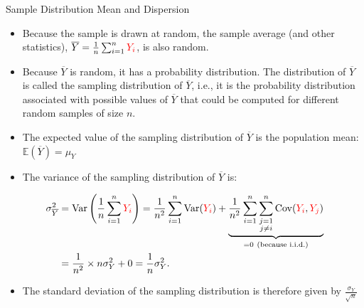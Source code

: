 \documentclass[notes,10pt, aspectratio=169]{beamer}
\begin{document}
\begin{frame}{Sample Distribution Mean and Dispersion}
    \begin{itemize}
        \item Because the sample is drawn at random, the sample average (and other statistics), $\overline{Y}=\frac{1}{n}\sum^n_{i=1} \textcolor{red}{Y_i}$, is also random.\vspace{.2cm}
        \item Because $\overline{Y}$ is random, it has a probability distribution. The distribution of $\overline{Y}$ is called the sampling distribution of $\overline{Y}$, i.e., it is the probability distribution associated with possible values of $\overline{Y}$ that could be computed for different random samples of size $n$.\vspace{.2cm}
        \item The expected value of the sampling distribution of $\overline{Y}$ is the population mean: $\mathbb{E}(\overline{Y})=\mu_Y$\vspace{.2cm}
        \item The variance of the sampling distribution of $\overline{Y}$ is:
    \end{itemize}
    \begin{eqnarray*}
        \begin{aligned}
        \sigma^2_{\overline{Y}}
        &=\operatorname{Var}\left(\frac{1}{n}\sum^n_{i=1} \textcolor{red}{Y_i}\right)
        =\frac{1}{n^2}\sum^n_{i=1} \operatorname{Var}(\textcolor{red}{Y_i})
        +\underbrace{\frac{1}{n^2}\sum^n_{i=1}\sum_{\substack{j=1\\j\neq i}}^n\operatorname{Cov}(\textcolor{red}{Y_i},\textcolor{red}{Y_j})}_{=0\ \text{(because i.i.d.)}}\\
        &=\frac{1}{n^2}\times n\sigma_Y^2+0
        =\frac{1}{n}\sigma_Y^2.
        \end{aligned}
    \end{eqnarray*}

    \begin{itemize}
        \item The standard deviation of the sampling distribution is therefore given by $\frac{\sigma_Y}{\sqrt{n}}$
    \end{itemize}
\end{frame}
\end{document}
